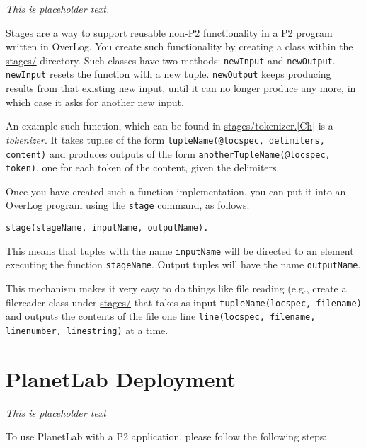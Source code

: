 \documentclass{article}
\begin{document}
\emph{This is placeholder text.}

Stages are a way to support reusable non-P2 functionality in a P2
program written in OverLog. You create such functionality by creating a
class within the \url{stages/} directory. Such classes have two methods:
\texttt{newInput} and \texttt{newOutput}. \texttt{newInput} resets the
function with a new tuple. \texttt{newOutput} keeps producing results
from that existing new input, until it can no longer produce any more,
in which case it asks for another new input. 

An example such function, which can be found in
\url{stages/tokenizer.[Ch]} is a \emph{tokenizer}. It takes tuples of
the form \lstinline$tupleName(@locspec, delimiters, content)$ and
produces outputs of the form
\lstinline$anotherTupleName(@locspec, token)$, one for each token of the content, given the delimiters. 

Once you have created such a function implementation, you can put it
into an OverLog program using the \lstinline$stage$ command, as follows: 
\begin{lstlisting}
stage(stageName, inputName, outputName).
\end{lstlisting}

This means that tuples with the name \lstinline$inputName$ will be
directed to an element executing the function
\lstinline$stageName$. Output tuples will have the name
\lstinline$outputName$. 

This mechanism makes it very easy to do things like file reading (e.g.,
create a filereader class under \url{stages/} that takes as input
\lstinline$tupleName(locspec, filename)$ and outputs the contents of the file one
line \lstinline$line(locspec, filename, linenumber, linestring)$ at a
time.








\section{PlanetLab Deployment}
\emph{This is placeholder text}

To use PlanetLab with a P2 application, please follow the following steps:
\end{document}
